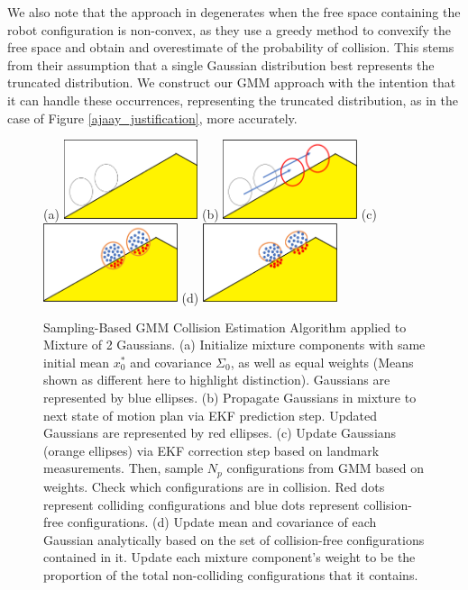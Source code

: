 \documentclass[journal]{IEEEtran}
\begin{document}
We also note that the approach in \cite{IEEEhowto:patil} degenerates when the free space containing the robot configuration is non-convex, as they use a greedy method to convexify the free space and obtain and overestimate of the probability of collision. This stems from their assumption that a single Gaussian distribution best represents the truncated distribution. We construct our GMM approach with the intention that it can handle these occurrences, representing the truncated distribution, as in the case of Figure \ref{ajaay_justification}, more accurately.


\begin{figure}[!t]
\centering
\subfloat (a) {\includegraphics[width=1.55in]{step1.png}%
\label{step_one}}
\hfil
\subfloat (b) {\includegraphics[width=1.55in]{step2.png}%
\label{step_two}}
\hfil
\subfloat (c) {\includegraphics[width=1.55in]{step3.png}%
\label{step_three}}
\hfil
\subfloat (d) {\includegraphics[width=1.55in]{step4.png}%
\label{step_four}}
\caption{Sampling-Based GMM Collision Estimation Algorithm applied to Mixture of 2 Gaussians. (a) Initialize mixture components with same initial mean $x_0^*$ and covariance $\Sigma_0$, as well as equal weights (Means shown as different here to highlight distinction). Gaussians are represented by blue ellipses. (b) Propagate Gaussians in mixture to next state of motion plan via EKF prediction step. Updated Gaussians are represented by red ellipses. (c) Update Gaussians (orange ellipses) via EKF correction step based on landmark measurements. Then, sample $N_p$ configurations from GMM based on weights. Check which configurations are in collision. Red dots represent colliding configurations and blue dots represent collision-free configurations. (d) Update mean and covariance of each Gaussian analytically based on the set of collision-free configurations contained in it. Update each mixture component's weight to be the proportion of the total non-colliding configurations that it contains.}
\label{algorithm_steps}
\end{figure}
\end{document}
